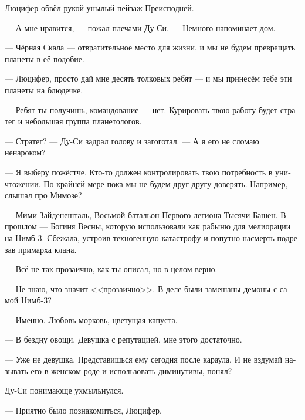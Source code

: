 \documentclass[a4paper,12pt,fleqn]{book}\usepackage{polyglossia}\setdefaultlanguage[babelshorthands=true]{russian}\setotherlanguage{english}\defaultfontfeatures{Ligatures=TeX,Mapping=tex-text}\usepackage{xcolor}\newcommand{\ml}[3]{#2}
\begin{document}
{Люцифер обвёл рукой унылый пейзаж Преисподней.

\ml{$0$}
{--- А мне нравится, --- пожал плечами Ду-Си.}
{``I like it,'' Du-Xi shrugged.}
\ml{$0$}
{--- Немного напоминает дом.}
{``Reminds me a little of my home.''}

--- Чёрная Скала --- отвратительное место для жизни, и мы не будем превращать планеты в её подобие.

\ml{$0$}
{--- Люцифер, просто дай мне десять толковых ребят --- и мы принесём тебе эти планеты на блюдечке.}
{``Lucifer, just give me ten good men, and you'll have those planets on a plate.''}

--- Ребят ты получишь, командование --- нет.
Курировать твою работу будет стратег и небольшая группа планетологов.

--- Стратег? --- Ду-Си задрал голову и загоготал.
--- А я его не сломаю ненароком?

--- Я выберу пожёстче.
Кто-то должен контролировать твою потребность в уничтожении.
По крайней мере пока мы не будем друг другу доверять.
Например, слышал про Мимозе?

\ml{$0$}
{--- Мими Зайденешталь, Восьмой батальон Первого легиона Тысячи Башен.}
{``Mimi Seidenestahl, Eighth battalion of the Thousand Towers First Legio.}
В прошлом --- Богиня Весны, которую использовали как рабыню для мелиорации на Нимб-3.
Сбежала, устроив техногенную катастрофу и попутно насмерть подрезав примарха клана.

--- Всё не так прозаично, как ты описал, но в целом верно.

--- Не знаю, что значит <<прозаично>>.
В деле были замешаны демоны с самой Нимб-3?

--- Именно.
\ml{$0$}
{Любовь-морковь, цветущая капуста.}
{Carrot love, blooming cabbage.''}

\ml{$0$}
{--- В бездну овощи.}
{``Gulf vegetables.}
\ml{$0$}
{Девушка с репутацией, мне этого достаточно.}
{A reputable girl, that's enough to me.''}

\ml{$0$}
{--- Уже не девушка.}
{``Not a girl anymore.}
\ml{$0$}
{Представишься ему сегодня после караула.}
{Report to him after your shift today.}
\ml{$0$}
{И не вздумай называть его в женском роде и использовать диминутивы, понял?}
{And don't you dare to call him in the feminine or use diminutives, right?''}

Ду-Си понимающе ухмыльнулся.

\ml{$0$}
{--- Приятно было познакомиться, Люцифер.}
{``Nice to meet you, Lucifer.''}

}
\end{document}

